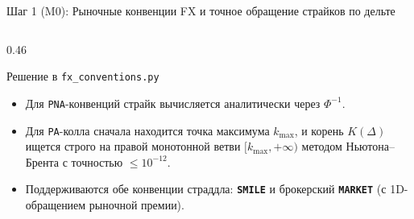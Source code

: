 \documentclass[aspectratio=169, 9pt]{beamer}
\begin{document}
\begin{frame}{Шаг 1 (M0): Рыночные конвенции FX и точное обращение страйков по дельте}
\begin{columns}[T]
\begin{column}{0.46\textwidth}
      \begin{exampleblock}{Решение в \texttt{fx\_conventions.py}}
        \begin{itemize}
          \item Для \texttt{PNA}-конвенций страйк вычисляется аналитически через $\Phi^{-1}$.
          \item Для \texttt{PA}-колла сначала находится точка максимума $k_{\max}$, и корень $K(\Delta)$ ищется строго на правой монотонной ветви $[k_{\max}, +\infty)$ методом Ньютона--Брента с точностью $\le 10^{-12}$.
          \item Поддерживаются обе конвенции страддла: \textbf{\texttt{SMILE}} и брокерский \textbf{\texttt{MARKET}} (с 1D-обращением рыночной премии).
        \end{itemize}
      \end{exampleblock}
    \end{column}
  \end{columns}
\end{frame}
\end{document}
